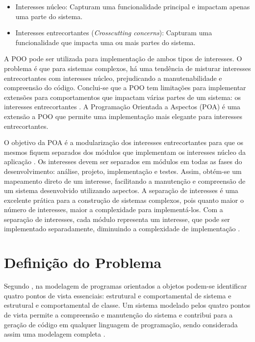 \begin{itemize}
  \item Interesses núcleo: Capturam uma funcionalidade principal e impactam apenas uma parte do sistema.
  \item Interesses entrecortantes (\textit{Crosscutting concerns}): Capturam uma funcionalidade que impacta uma ou mais partes do sistema. 
\end{itemize}

A POO pode ser utilizada para implementação de ambos tipos de interesses. O problema é que para sistemas complexos, há uma tendência de misturar
interesses entrecortantes com interesses núcleo, prejudicando a manutenabilidade e compreensão do código. Conclui-se que a POO tem limitações para
implementar extensões para comportamentos que impactam várias partes de um sistema: os interesses entrecortantes
\cite{Kiczales97aspect-orientedprogramming}. A Programação Orientada a Aspectos (POA)  é uma extensão a
POO que permite uma implementação mais elegante para interesses entrecortantes.

O objetivo da POA é a modularização dos interesses entrecortantes para que os mesmos fiquem separados dos módulos que implementam os interesses
núcleo da aplicação \cite{Laddad:2003:AAP:993468}. Os interesses devem ser separados em módulos em todas as fases do desenvolvimento: análise,
projeto, implementação e testes. Assim, obtém-se um mapeamento direto de um interesse, facilitando a manutenção e compreensão de um sistema
desenvolvido utilizando aspectos. A separação de interesses é uma excelente prática para a construção de sistemas complexos, pois quanto maior o
número de interesses, maior a complexidade para implementá-los. Com a separação de interesses, cada módulo representa um interesse, que pode ser
implementado separadamente, diminuindo a complexidade de implementação \cite{Jacobson:2004:ASD:1062430}.

\section{Definição do Problema}

Segundo \cite{silva:00}, na modelagem de programas orientados a objetos podem-se identificar quatro pontos de vista essenciais: estrutural e
comportamental de sistema e estrutural e comportamental de classe. Um sistema modelado pelos quatro pontos de vista permite a compreensão e manutenção
do sistema e contribui para a geração de código em qualquer linguagem de programação, sendo considerada assim uma modelagem completa \cite{silva:07}.

